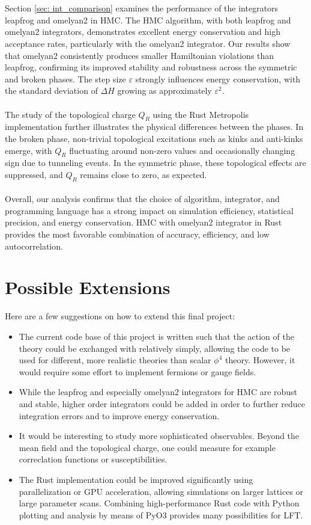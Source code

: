 \\\\
Section \ref{sec: int_comparison} examines the performance of the integrators leapfrog and omelyan2 in HMC. The HMC algorithm, with both leapfrog and omelyan2 integrators, demonstrates excellent energy conservation and high acceptance rates, particularly with the omelyan2 integrator. Our results show that omelyan2 consistently produces smaller Hamiltonian violations than leapfrog, confirming its improved stability and robustness across the symmetric and broken phases. The step size $\varepsilon$ strongly influences energy conservation, with the standard deviation of $\Delta H$ growing as approximately $\varepsilon^2$.
\\\\
The study of the topological charge $Q_R$ using the Rust Metropolis implementation further illustrates the physical differences between the phases. In the broken phase, non-trivial topological excitations such as kinks and anti-kinks emerge, with $Q_R$ fluctuating around non-zero values and occasionally changing sign due to tunneling events. In the symmetric phase, these topological effects are suppressed, and $Q_R$ remains close to zero, as expected.
\\\\
Overall, our analysis confirms that the choice of algorithm, integrator, and programming language has a strong impact on simulation efficiency, statistical precision, and energy conservation. HMC with omelyan2 integrator in Rust provides the most favorable combination of accuracy, efficiency, and low autocorrelation.
\section{Possible Extensions}
Here are a few suggestions on how to extend this final project: 
\begin{itemize}
    \item The current code base of this project is written such that the action of the theory could be exchanged with relatively simply, allowing the code to be used for different, more realistic theories than scalar $\phi^4$ theory. However, it would require some effort to implement fermions or gauge fields. 
    \item While the leapfrog and especially omelyan2 integrators for HMC are robust and stable, higher order integrators could be added in order to further reduce integration errors and to improve energy conservation. 
    \item It would be interesting to study more sophisticated observables. Beyond the mean field and the topological charge, one could measure for example correclation functions or susceptibilities. 
    \item The Rust implementation could be improved significantly using parallelization or GPU acceleration, allowing simulations on larger lattices or large parameter scans. Combining high-performance Rust code with Python plotting and analysis by means of PyO3 provides many possibilities for LFT. 
\end{itemize}